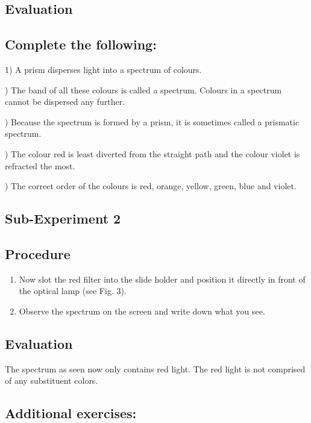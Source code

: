 \documentclass[12pt]{article}
\begin{document}
\subsection*{Evaluation}

\subsection*{Complete the following:}

1) A prism disperses light into a spectrum of colours.

) The band of all these colours is called a spectrum. Colours in a spectrum cannot be dispersed any further.

) Because the spectrum is formed by a prism, it is sometimes called a prismatic spectrum.

) The colour red is least diverted from the straight path and the colour violet is refracted the most.

) The correct order of the colours is red, orange, yellow, green, blue and violet.

\subsection*{Sub-Experiment 2}

\subsection*{Procedure}

\begin{enumerate}
\item Now slot the red filter into the slide holder and position it directly in front of the optical lamp (see Fig. 3).
\item Observe the spectrum on the screen and write down what you see. 
\end{enumerate}

\subsection*{Evaluation}

The spectrum as seen now only contains red light. The red light is not comprised of any substituent colors.

\subsection*{Additional exercises:}
\end{document}
